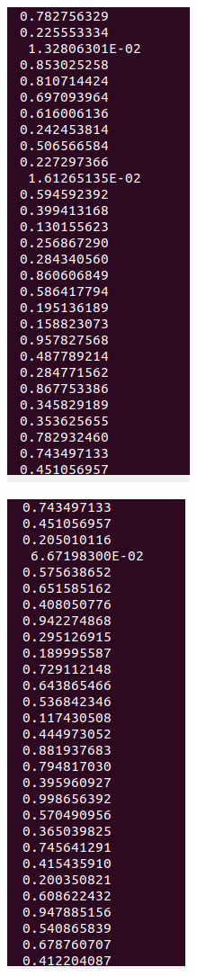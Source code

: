 \documentclass[12pt,a4paper]{article}
\begin{document}
\begin{enumerate}
    \begin{figure}[h!]
        \centering
        \includegraphics[scale=0.6]{3.6.PNG}
    \end{figure}
    
    \begin{figure}[h!]
        \centering
        \includegraphics[scale=0.6]{3.7.PNG}
    \end{figure}
    

\end{enumerate}
\end{document}

